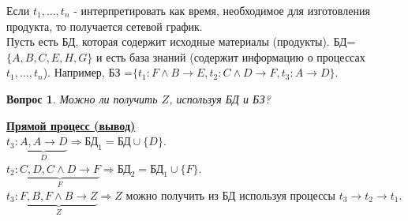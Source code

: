 \documentclass{article}
\newtheorem{question}{Вопрос}
\numberwithin{example}{section}
\numberwithin{question}{section}
\numberwithin{Remark}{section}
\numberwithin{theorem}{section}
\numberwithin{definition}{section}
\numberwithin{proposition}{section}
\begin{document}
Если $t_1,\ldots,t_n$ - интерпретировать как время, необходимое для изготовления продукта, то получается сетевой график.\\
Пусть есть БД, которая содержит исходные материалы (продукты). БД=$\{A,B,C,E,H,G\}$ и есть база знаний (содержит информацию о процессах $t_1,\ldots,t_n$). Например, БЗ =$\{t_1:F\wedge B\to E,t_2:C\wedge D\to F,t_3:A\to D \}$.
\begin{question}
	Можно ли получить $Z$, используя БД и БЗ?
\end{question}
\underline{\textbf{Прямой процесс (вывод)}}\\
$t_3:\underbrace{A,A\to D}_{D}\Rightarrow \text{БД}_1=\text{БД}\cup\{ D\}$.\\
$t_2:\underbrace{C,D,C\wedge D\to F}_{F}\Rightarrow \text{БД}_2=\text{БД}_1\cup\{ F\}$.\\
$t_3:\underbrace{F,B,F\wedge B\to Z}_{Z}\Rightarrow Z\text{ можно получить из БД используя процессы } t_3\to t_2\to t_1$.\\
\end{document}
